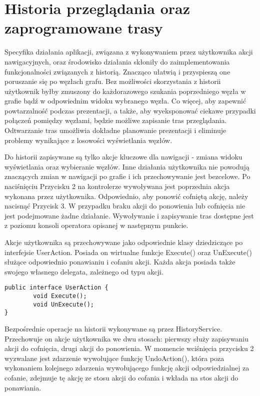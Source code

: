 \section{Historia przeglądania oraz zaprogramowane trasy}
Specyfika działania aplikacji, związana z wykonywaniem przez użytkownika akcji nawigacyjnych, oraz środowisko działania skłoniły do zaimplementowania funkcjonalności związanych z historią. Znacząco ułatwią i przyspieszą one poruszanie się po węzłach grafu. Bez możliwości skorzystania z historii użytkownik byłby zmuszony do każdorazowego szukania poprzedniego węzła  w grafie bądź w odpowiednim widoku wybranego węzła. Co więcej, aby zapewnić powtarzalność podczas prezentacji, a także, aby wyeksponować ciekawe przypadki połączeń pomiędzy węzłami, będzie możliwe zapisanie tras przeglądania. Odtwarzanie tras umożliwia dokładne planowanie prezentacji i eliminuje problemy wynikające z losowości wyświetlania węzłów. 

Do historii zapisywane są tylko akcje kluczowe dla nawigacji - zmiana widoku wyświetlania oraz wybieranie węzłów. Inne działania użytkownika nie powodują znaczących zmian w nawigacji po grafie i ich przechowywanie jest bezcelowe. Po naciśnięciu Przycisku 2 na kontrolerze wywoływana jest poprzednia akcja wykonana przez użytkownika. Odpowiednio, aby ponowić cofniętą akcję, należy nacisnąć Przycisk 3. W przypadku braku akcji do ponowienia lub cofnięcia nie jest podejmowane żadne działanie. Wywoływanie i zapisywanie tras dostępne jest z poziomu konsoli operatora opisanej w następnym punkcie.


Akcje użytkownika są przechowywane jako odpowiednie klasy dziedziczące po interfejsie UserAction. Posiada on wirtualne funkcje Execute() oraz UnExecute() służące odpowiednio ponawianiu i cofaniu akcji. Każda akcja posiada także swojego własnego delegata, zależnego od typu akcji. 

\begin{lstlisting}[caption={Interfejs UserAction}, label=lst:IUserAction]
public interface UserAction {
		void Execute();
		void UnExecute();
}
\end{lstlisting}


Bezpośrednie operacje na historii wykonywane są przez HistoryService. Przechowuje on akcje użytkownika we dwu stosach: pierwszy służy zapisywaniu akcji do cofnięcia, drugi akcji do ponowienia. W momencie wciśnięcia przycisku 2 wyzwalane jest zdarzenie wywołujące funkcję UndoAction(), która poza wykonaniem kolejnego zdarzenia wywołującego funkcję akcji odpowiedzialnej za cofanie, zdejmuje tę akcję ze stosu akcji do cofania i wkłada na stos akcji do ponawiania.

